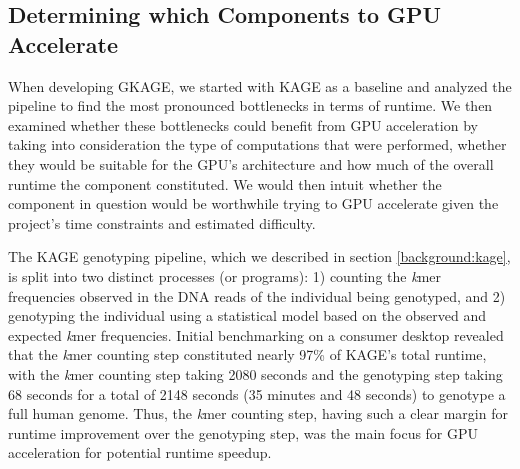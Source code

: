 \subsection{Determining which Components to GPU Accelerate} \label{methods:determining_which_components_to_gpu_accelerate}

When developing GKAGE, we started with KAGE as a baseline and analyzed the pipeline to find the most pronounced bottlenecks in terms of runtime.
We then examined whether these bottlenecks could benefit from GPU acceleration by taking into consideration the type of computations that were performed, whether they would be suitable for the GPU's architecture and how much of the overall runtime the component constituted. 
We would then intuit whether the component in question would be worthwhile trying to GPU accelerate given the project's time constraints and estimated difficulty.

The KAGE genotyping pipeline, which we described in section \ref{background:kage}, is split into two distinct processes (or programs): 1) counting the \textit{k}mer frequencies observed in the DNA reads of the individual being genotyped, and 2) genotyping the individual using a statistical model based on the observed and expected \textit{k}mer frequencies.
Initial benchmarking on a consumer desktop revealed that the \textit{k}mer counting step constituted nearly 97\% of KAGE's total runtime, with the \textit{k}mer counting step taking 2080 seconds and the genotyping step taking 68 seconds for a total of 2148 seconds (35 minutes and 48 seconds) to genotype a full human genome.
Thus, the \textit{k}mer counting step, having such a clear margin for runtime improvement over the genotyping step, was the main focus for GPU acceleration for potential runtime speedup.
